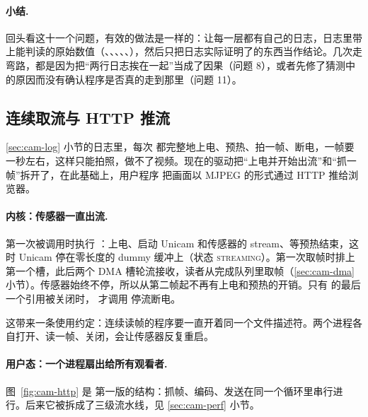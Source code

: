 \paragraph{小结.} 回头看这十一个问题，有效的做法是一样的：让每一层都有自己的日志，日志里带上能判读的原始数值（、、、、、），然后只把日志实际证明了的东西当作结论。几次走弯路，都是因为把“两行日志挨在一起”当成了因果（问题 8），或者先修了猜测中的原因而没有确认程序是否真的走到那里（问题 11）。

\subsection{连续取流与 HTTP 推流}
\label{sec:cam-http}

\ref{sec:cam-log} 小节的日志里，每次  都完整地上电、预热、拍一帧、断电，一帧要一秒左右，这样只能拍照，做不了视频。现在的驱动把“上电并开始出流”和“抓一帧”拆开了，在此基础上，用户程序  把画面以 MJPEG 的形式通过 HTTP 推给浏览器。

\paragraph{内核：传感器一直出流.}  第一次被调用时执行 ：上电、启动 Unicam 和传感器的 stream、等预热结束，这时 Unicam 停在零长度的 dummy 缓冲上（状态 \textsc{streaming}）。第一次取帧时排上第一个槽，此后两个 DMA 槽轮流接收，读者从完成队列里取帧（\ref{sec:cam-dma} 小节）。传感器始终不停，所以从第二帧起不再有上电和预热的开销。只有  的最后一个引用被关闭时， 才调用  停流断电。

这带来一条使用约定：连续读帧的程序要一直开着同一个文件描述符。两个进程各自打开、读一帧、关闭，会让传感器反复重启。

\paragraph{用户态：一个进程扇出给所有观看者.} 图~\ref{fig:cam-http} 是  第一版的结构：抓帧、编码、发送在同一个循环里串行进行。后来它被拆成了三级流水线，见 \ref{sec:cam-perf} 小节。


